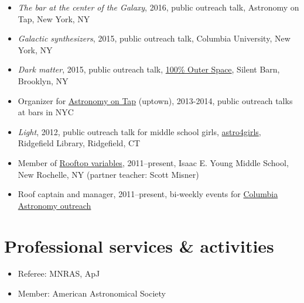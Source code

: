 \documentclass[12pt,letterpaper]{article}
\begin{document}
\begin{itemize}
    \item \emph{The bar at the center of the Galaxy}, 2016, public outreach talk, Astronomy on Tap, New York, NY
    \item \emph{Galactic synthesizers}, 2015, public outreach talk, Columbia University, New York, NY
    \item \emph{Dark matter}, 2015, public outreach talk, \href{http://silentbarn.org/2015/03/100-outer-space-party}{100\% Outer Space}, Silent Barn, Brooklyn, NY
    \item Organizer for \href{http://astronomyontap.org/}{Astronomy on Tap} (uptown), 2013-2014, public outreach talks at bars in NYC
    \item \emph{Light}, 2012, public outreach talk for middle school girls, \href{http://www.newstimes.com/news/article/Astronomer-Shoot-for-the-stars-3380793.php}{astro4girls}, Ridgefield Library, Ridgefield, CT
    \item Member of \href{http://rv.astro.columbia.edu}{Rooftop variables}, 2011--present, Isaac E. Young Middle School, New Rochelle, NY (partner teacher: Scott Misner)
    \item Roof captain and manager, 2011--present, bi-weekly events for \href{http://outreach.astro.columbia.edu/}{Columbia Astronomy outreach}
\end{itemize}

\section*{Professional services \& activities}

\begin{itemize}
	\item Referee: MNRAS, ApJ
	\item Member: American Astronomical Society
\end{itemize}
\end{document}
